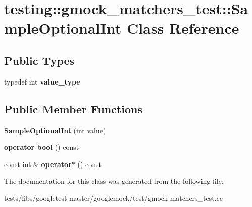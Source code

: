 \hypertarget{classtesting_1_1gmock__matchers__test_1_1SampleOptionalInt}{}\section{testing\+:\+:gmock\+\_\+matchers\+\_\+test\+:\+:Sample\+Optional\+Int Class Reference}
\label{classtesting_1_1gmock__matchers__test_1_1SampleOptionalInt}
\subsection*{Public Types}
\begin{DoxyCompactItemize}
\item 
\mbox{\label{classtesting_1_1gmock__matchers__test_1_1SampleOptionalInt_a9f1309a849993c56be680fc5468bf01a}} 
typedef int {\bfseries value\+\_\+type}
\end{DoxyCompactItemize}
\subsection*{Public Member Functions}
\begin{DoxyCompactItemize}
\item 
\mbox{\label{classtesting_1_1gmock__matchers__test_1_1SampleOptionalInt_aa0e9539a55f97693e24230e5857f7297}} 
{\bfseries Sample\+Optional\+Int} (int value)
\item 
\mbox{\label{classtesting_1_1gmock__matchers__test_1_1SampleOptionalInt_a1e638b606b7e48b395a76304153c8f17}} 
{\bfseries operator bool} () const
\item 
\mbox{\label{classtesting_1_1gmock__matchers__test_1_1SampleOptionalInt_a6b8fbe7ce0f98901e727c2e8e5415eba}} 
const int \& {\bfseries operator$\ast$} () const
\end{DoxyCompactItemize}


The documentation for this class was generated from the following file\+:\begin{DoxyCompactItemize}
\item 
tests/libs/googletest-\/master/googlemock/test/gmock-\/matchers\+\_\+test.\+cc\end{DoxyCompactItemize}
